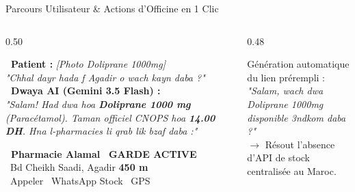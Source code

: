 \documentclass[aspectratio=169,10pt]{beamer}
\begin{document}
\begin{frame}{Parcours Utilisateur \& Actions d'Officine en 1 Clic}
    \begin{columns}[T]
        \begin{column}{0.50\textwidth}
            \begin{tcolorbox}[colback=white,colframe=primary,arc=2mm,title={\footnotesize \faComments~Simulation Interface Chat Multimodal},coltitle=white]
                \scriptsize
                \textbf{\faUser~Patient :} \textit{[Photo Doliprane 1000mg]} \\
                \textit{"Chhal dayr hada f Agadir o wach kayn daba ?"} \\[2mm]
                \textbf{\faRobot~Dwaya AI (Gemini 3.5 Flash) :} \\
                \textit{"Salam! Had dwa hoa \textbf{Doliprane 1000 mg} (Paracétamol). Taman officiel CNOPS hoa \textbf{14.00 DH}. Hna l-pharmacies li qrab lik bzaf daba :"} \\[1.5mm]
                \begin{tcolorbox}[colback=lightbg,colframe=secondary!40,arc=1mm,left=2mm,right=2mm,top=1mm,bottom=1mm]
                    \tiny \textbf{\faHospital~Pharmacie Alamal} \hfill \color{success}\textbf{\faClock~GARDE ACTIVE}\\
                    \faMapMarker*~Bd Cheikh Saadi, Agadir \hfill \textbf{450 m}\\
                    \vspace{1mm}
                    \color{white}
                    \colorbox{accent}{\faPhone~Appeler} \hspace{1mm}
                    \colorbox{success}{\faWhatsapp~WhatsApp Stock} \hspace{1mm}
                    \colorbox{darkslate}{\faDirections~GPS}
                \end{tcolorbox}
            \end{tcolorbox}
        \end{column}

        \begin{column}{0.48\textwidth}
            \begin{tcolorbox}[colback=white,colframe=success!80!black,arc=2mm,title={\footnotesize \faWhatsapp~1. Vérification Stock sur WhatsApp},coltitle=white]
                \scriptsize
                Génération automatique du lien prérempli : \\
                \textit{"Salam, wach dwa Doliprane 1000mg disponible 3ndkom daba ?"}\\
                $\rightarrow$ Résout l'absence d'API de stock centralisée au Maroc.
            \end{tcolorbox}


\end{column}
\end{columns}
\end{frame}
\end{document}
